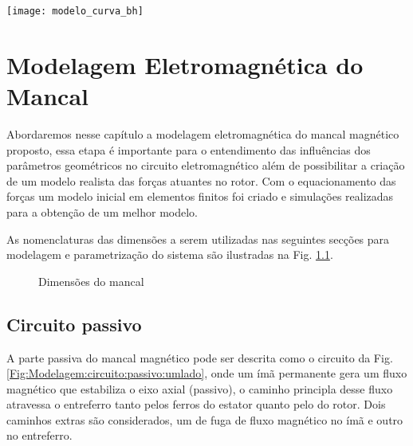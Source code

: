 \pagestyle{empty}
\cleardoublepage
\pagestyle{fancy}

\begin{center}
\texttt{[image: modelo\_curva\_bh]}
\end{center}


\chapter{Modelagem Eletromagnética do Mancal}

%


Abordaremos nesse capítulo a modelagem eletromagnética do mancal magnético proposto, essa etapa é importante para o entendimento das influências dos parâmetros geométricos no circuito eletromagnético além de possibilitar a criação de um modelo realista das forças atuantes no rotor. Com o equacionamento das forças um modelo inicial em elementos finitos foi criado e simulações realizadas para a obtenção de um melhor modelo. 

As nomenclaturas das dimensões a serem utilizadas nas seguintes secções para modelagem e parametrização do sistema são ilustradas na Fig. \ref{Fig:Modelagem:Dimensoes}.



\begin{figure}[!ht]
	\centering
	\def\svgwidth{\columnwidth}
	
		\caption{Dimensões do mancal}
		\label{Fig:Modelagem:Dimensoes}
\end{figure} 

\section{Circuito passivo}

A parte passiva do mancal magnético pode ser descrita como o circuito da Fig. \ref{Fig:Modelagem:circuito:passivo:umlado}, onde um ímã permanente gera um fluxo magnético que estabiliza o eixo axial (passivo), o caminho principla desse fluxo atravessa o entreferro tanto pelos ferros do estator quanto pelo do rotor. Dois caminhos extras são considerados, um de fuga de fluxo magnético no ímã e outro no entreferro. 

